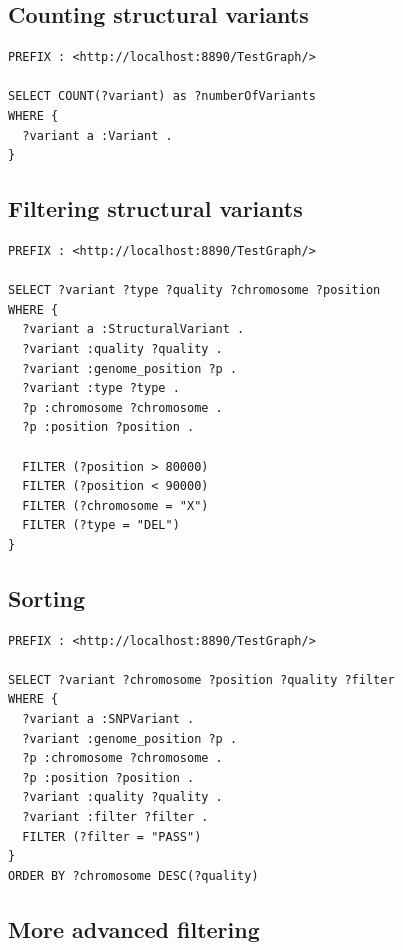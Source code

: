 \documentclass[11pt,a4paper,oneside]{book}
\begin{document}
\subsection{Counting structural variants}

\begin{siderules}
\begin{verbatim}
PREFIX : <http://localhost:8890/TestGraph/>

SELECT COUNT(?variant) as ?numberOfVariants
WHERE {
  ?variant a :Variant .
}
\end{verbatim}
\end{siderules}

\subsection{Filtering structural variants}

\begin{siderules}
\begin{verbatim}
PREFIX : <http://localhost:8890/TestGraph/>

SELECT ?variant ?type ?quality ?chromosome ?position
WHERE {
  ?variant a :StructuralVariant .
  ?variant :quality ?quality .
  ?variant :genome_position ?p .
  ?variant :type ?type .
  ?p :chromosome ?chromosome .
  ?p :position ?position .

  FILTER (?position > 80000)
  FILTER (?position < 90000)
  FILTER (?chromosome = "X")
  FILTER (?type = "DEL")
}
\end{verbatim}
\end{siderules}

\subsection{Sorting}

\begin{siderules}
\begin{verbatim}
PREFIX : <http://localhost:8890/TestGraph/>

SELECT ?variant ?chromosome ?position ?quality ?filter
WHERE {
  ?variant a :SNPVariant .
  ?variant :genome_position ?p .
  ?p :chromosome ?chromosome .
  ?p :position ?position .
  ?variant :quality ?quality .
  ?variant :filter ?filter .
  FILTER (?filter = "PASS")
}
ORDER BY ?chromosome DESC(?quality)
\end{verbatim}
\end{siderules}

\subsection{More advanced filtering}
\end{document}
